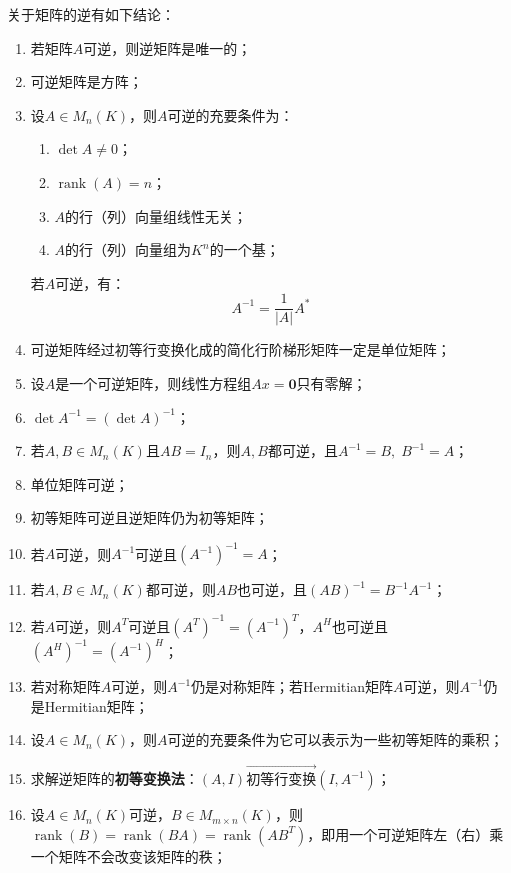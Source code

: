 \begin{property}\label{prop:InvertibleMatrix}
	关于矩阵的逆有如下结论：
	\begin{enumerate}
		\item 若矩阵$A$可逆，则逆矩阵是唯一的；
		\item 可逆矩阵是方阵；
		\item 设$A\in M_{n}(K)$，则$A$可逆的充要条件为：
		\begin{enumerate}
			\item $\det A\ne0$；
			\item $\operatorname{rank}(A)=n$；
			\item $A$的行（列）向量组线性无关；
			\item $A$的行（列）向量组为$K^n$的一个基；
		\end{enumerate}
		若$A$可逆，有：
		\begin{equation*}
			A^{-1}=\frac{1}{|A|}A^*
		\end{equation*}
		\item 可逆矩阵经过初等行变换化成的简化行阶梯形矩阵一定是单位矩阵；
		\item 设$A$是一个可逆矩阵，则线性方程组$Ax=\mathbf{0}$只有零解；
		\item $\det A^{-1}=(\det A)^{-1}$；
		\item 若$A,B\in M_{n}(K)$且$AB=I_n$，则$A,B$都可逆，且$A^{-1}=B,\;B^{-1}=A$；
		\item 单位矩阵可逆；
		\item 初等矩阵可逆且逆矩阵仍为初等矩阵；
		\item 若$A$可逆，则$A^{-1}$可逆且$(A^{-1})^{-1}=A$；
		\item 若$A,B\in M_{n}(K)$都可逆，则$AB$也可逆，且$(AB)^{-1}=B^{-1}A^{-1}$；
		\item 若$A$可逆，则$A^T$可逆且$(A^T)^{-1}=(A^{-1})^T$，$A^H$也可逆且$(A^H)^{-1}=(A^{-1})^H$；
		\item 若对称矩阵$A$可逆，则$A^{-1}$仍是对称矩阵；若Hermitian矩阵$A$可逆，则$A^{-1}$仍是Hermitian矩阵；
		\item 设$A\in M_{n}(K)$，则$A$可逆的充要条件为它可以表示为一些初等矩阵的乘积；
		\item 求解逆矩阵的\textbf{初等变换法}：$(A, I)\overrightarrow{初等行变换}(I,A^{-1})$；
		\item 设$A\in M_{n}(K)$可逆，$B\in M_{m\times n}(K)$，则$\operatorname{rank}(B)=\operatorname{rank}(BA)=\operatorname{rank}(AB^T)$，即用一个可逆矩阵左（右）乘一个矩阵不会改变该矩阵的秩；
	\end{enumerate}
\end{property}
